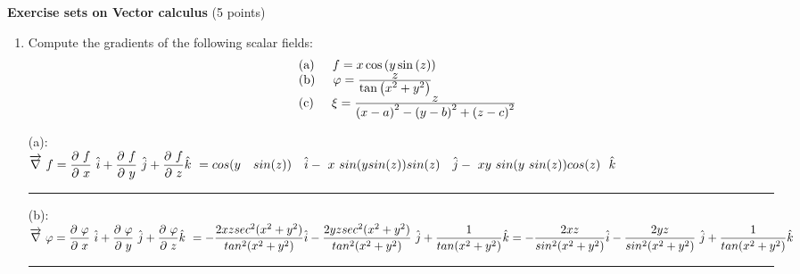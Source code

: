 \documentclass[fleqn]{article}
\begin{document}
  \pagebreak

  \textbf{Exercise sets on Vector calculus} (5 points)
  \begin{enumerate}
    \item Compute the gradients of the following scalar fields: \\
      \[
      \begin{array}{lll}
      & {\rm (a)\hspace{0.2in}} f=x\cos \left( y\sin \left( z\right) \right)  \\
      
      & {\rm (b)\hspace{0.2in} }\varphi =\frac{\textstyle z}{\textstyle\tan \left( x^{2}+y^{2}\right) } \\
      
      & {\rm
      (c)\hspace{0.2in}}\xi =\frac{\textstyle z}{\textstyle \left( x-a\right) ^{2}-\left( y-b\right) ^{2}+\left(z-c\right) ^{2}}
      \end{array}
      \]

      \textcolor{hwColor}{
        (a): \\ 
        $
          \overrightarrow{\nabla} f=\dfrac{\partial f}{\partial x} \hat{i}+\dfrac{\partial f}{\partial y} \hat{j}+\dfrac{\partial f}{\partial z}\hat{k} \\ 
          =cos(y ~ sin(z)) ~ \hat{i}- x sin(ysin(z))sin(z) ~ \hat{j}- xy sin(y sin(z))cos(z)~ \hat{k}
        $
      }

      \rule{15cm}{1pt}

      \textcolor{hwColor}{
        (b): \\
        $
          \overrightarrow{\nabla} \varphi=\dfrac{\partial \varphi}{\partial x} \hat{i}+\dfrac{\partial \varphi}{\partial y} \hat{j}+\dfrac{\partial \varphi}{\partial z}\hat{k} \\ 
          =-\dfrac{2xz sec^2(x^2+y^2)}{tan^2(x^2+y^2)} \hat{i}
          -\dfrac{2yz sec^2(x^2+y^2)}{tan^2(x^2+y^2)} \hat{j}
          +\dfrac{1}{tan(x^2+y^2)}\hat{k}
          \\
          =-\dfrac{2xz}{sin^2(x^2+y^2)} \hat{i}
          -\dfrac{2yz}{sin^2(x^2+y^2)} \hat{j}
          +\dfrac{1}{tan(x^2+y^2)}\hat{k} \\ \\ \\
        $
      }

      \rule{15cm}{1pt}


\end{enumerate}
\end{document}
